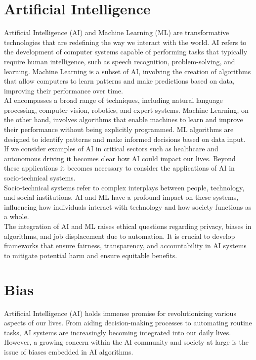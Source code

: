 \documentclass[12pt,a4paper,openright,twoside]{book}
\begin{document}
\section{Artificial Intelligence}
Artificial Intelligence (AI) and Machine Learning (ML) are transformative technologies that are redefining the way we interact with the world. AI refers to the development of computer systems capable of performing tasks that typically require human intelligence, such as speech recognition, problem-solving, and learning. Machine Learning is a subset of AI, involving the creation of algorithms that allow computers to learn patterns and make predictions based on data, improving their performance over time. \\
AI encompasses a broad range of techniques, including natural language processing, computer vision, robotics, and expert systems. Machine Learning, on the other hand, involves algorithms that enable machines to learn and improve their performance without being explicitly programmed. ML algorithms are designed to identify patterns and make informed decisions based on data input. \\
If we consider examples of AI in critical sectors such as healthcare and autonomous driving it becomes clear how AI could impact our lives. Beyond these applications it becomes necessary to consider the applications of AI in socio-technical systems. \\
Socio-technical systems refer to complex interplays between people, technology, and social institutions. AI and ML have a profound impact on these systems, influencing how individuals interact with technology and how society functions as a whole. \\
The integration of AI and ML raises ethical questions regarding privacy, biases in algorithms, and job displacement due to automation. It is crucial to develop frameworks that ensure fairness, transparency, and accountability in AI systems to mitigate potential harm and ensure equitable benefits. \\

\section{Bias}
Artificial Intelligence (AI) holds immense promise for revolutionizing various aspects of our lives. From aiding decision-making processes to automating routine tasks, AI systems are increasingly becoming integrated into our daily lives. However, a growing concern within the AI community and society at large is the issue of biases embedded in AI algorithms.
\end{document}
